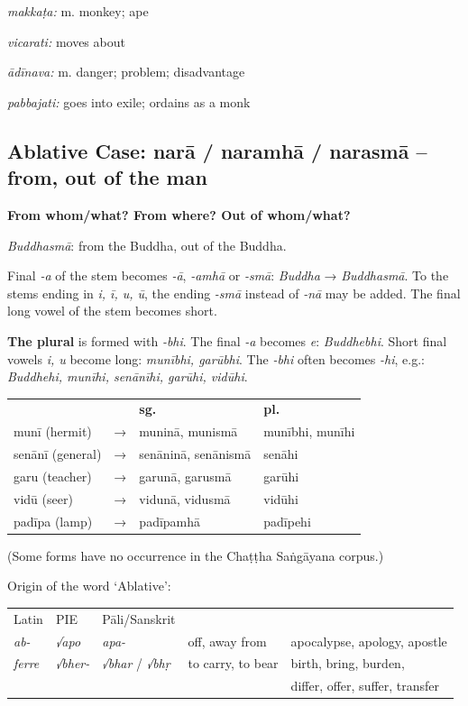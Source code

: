\documentclass[11pt,oneside]{memoir}
\begin{document}
\normalArrayStretch

\emph{makkaṭa:} m. monkey; ape

\emph{vicarati:} moves about

\emph{ādīnava:} m. danger; problem; disadvantage

\emph{pabbajati:} goes into exile; ordains as a monk

\clearpage
\subsection{Ablative Case: narā / naramhā / narasmā -- from, out of the man}
\label{sec:orge8e1d55}

\textbf{From whom/what? From where? Out of whom/what?}

\emph{Buddhasmā}: from the Buddha, out of the Buddha.

Final \emph{-a} of the stem becomes \emph{-ā}, \emph{-amhā} or \emph{-smā}: \emph{Buddha} → \emph{Buddhasmā}.
To the stems ending in \emph{i, ī, u, ū}, the ending \emph{-smā} instead of \emph{-nā} may be
added. The final long vowel of the stem becomes short.

\textbf{The plural} is formed with \emph{-bhi}. The final \emph{-a} becomes \emph{e}: \emph{Buddhebhi}.
Short final vowels \emph{i, u} become long: \emph{munībhi, garūbhi}. The \emph{-bhi} often
becomes \emph{-hi}, e.g.: \emph{Buddhehi, munīhi, senānīhi, garūhi, vidūhi}.

\begin{center}
\begin{tabular}{llll}
 &  & \textbf{sg.} & \textbf{pl.}\\
munī (hermit) & → & muninā, munismā & munībhi, munīhi\\
senānī (general) & → & senāninā, senānismā & senāhi\\
garu (teacher) & → & garunā,  garusmā & garūhi\\
vidū (seer) & → & vidunā, vidusmā & vidūhi\\
padīpa (lamp) & → & padīpamhā & padīpehi\\
\end{tabular}
\end{center}

(Some forms have no occurrence in the Chaṭṭha Saṅgāyana corpus.)

Origin of the word `Ablative':

\begin{center}
\begin{tabular}{lllll}
Latin & PIE & Pāli/Sanskrit &  & \\
\emph{ab-} & \emph{√apo} & \emph{apa-} & off, away from & apocalypse, apology, apostle\\
\emph{ferre} & \emph{√bher-} & \emph{√bhar} / \emph{√bhṛ} & to carry, to bear & birth, bring, burden,\\
 &  &  &  & differ, offer, suffer, transfer\\
\end{tabular}
\end{center}
\end{document}
